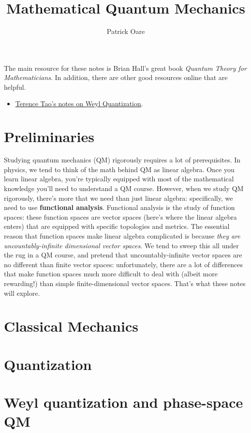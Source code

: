 \def \root {../../}			%


\title{Mathematical Quantum Mechanics}
\author{Patrick Oare}
\date{}							%


\maketitle

 \begin{resources}
The main resource for these notes is Brian Hall's great book \textit{Quantum Theory for Mathematicians}. In addition, there are other good resources online that are helpful.
\begin{itemize}
	\item \href{https://terrytao.wordpress.com/2012/10/07/some-notes-on-weyl-quantisation/}{Terence Tao's notes on Weyl Quantization}.
\end{itemize}
\end{resources}

\section{Preliminaries}

Studying quantum mechanics (QM) rigorously requires a lot of prerequisites. In physics, we tend to think of the math behind QM as linear algebra. Once you learn linear algebra, you're typically equipped with most of the mathematical knowledge you'll need to understand a QM course. However, when we study QM rigorously, there's more that we need than just linear algebra: specifically, we need to use \textbf{functional analysis}. Functional analysis is the study of function spaces: these function spaces are vector spaces (here's where the linear algebra enters) that are equipped with specific topologies and metrics. The essential reason that function spaces make linear algebra complicated is because \textit{they are uncountably-infinite dimensional vector spaces}. We tend to sweep this all under the rug in a QM course, and pretend that uncountably-infinite vector spaces are no different than finite vector spaces: unfortunately, there are a lot of differences that make function spaces much more difficult to deal with (albeit more rewarding!) than simple finite-dimensional vector spaces. That's what these notes will explore. 

\section{Classical Mechanics}

\section{Quantization}

\section{Weyl quantization and phase-space QM}

